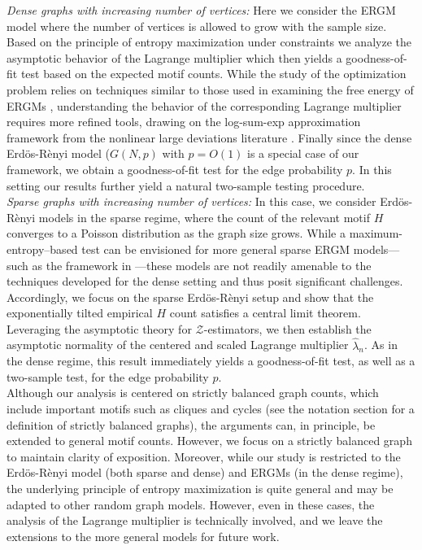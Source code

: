 \documentclass[12pt]{article}
\def\er{ Erd{\"o}s-R{\`e}nyi }
\numberwithin{equation}{section}
\begin{document}
\textit{Dense graphs with increasing number of vertices:} 
Here we consider the ERGM model where the number of vertices is allowed to grow with the sample size. Based on the principle of entropy maximization under constraints we analyze the asymptotic behavior of the Lagrange multiplier which then yields a goodness-of-fit test based on the expected motif counts. While the study of the optimization problem relies on techniques similar to those used in examining the free energy of ERGMs \cite{chatterjee2013estimating}, understanding the behavior of the corresponding Lagrange multiplier 
requires more refined tools, drawing on the log-sum-exp approximation framework from the nonlinear large deviations literature \cite{chatterjee2016nonlinear}. Finally since the dense \er model ($G(N,p)$ with $p=O(1)$ is a special case of our framework, we obtain a goodness-of-fit test for the edge probability $p$. In this setting our results further yield a natural two-sample testing procedure.\\



\textit{Sparse graphs with increasing number of vertices:} In this case, we consider \er models in the sparse regime, where the count of the relevant motif $H$ converges to a Poisson distribution as the graph size grows. While a maximum-entropy–based test can be envisioned for more general sparse ERGM models—such as the framework in \cite{cook2024typical}—these models are not readily amenable to the techniques developed for the dense setting and thus posit significant challenges.
Accordingly, we focus on the sparse \er setup and show that the exponentially tilted empirical $H$ count satisfies a central limit theorem. Leveraging the asymptotic theory for $\mathcal{Z}$-estimators,
 we then establish the asymptotic normality of the centered and scaled Lagrange multiplier 
$\hat{\lambda}_n$. As in the dense regime, this result immediately yields a goodness-of-fit test, as well as a two-sample test, for the edge probability 
$p$.\\


 Although our analysis is centered on strictly balanced graph counts, which include important motifs such as cliques and cycles (see the notation section for a definition of strictly balanced graphs), the arguments can, in principle, be extended to general motif counts. However, we focus on a strictly balanced graph to maintain clarity of exposition. Moreover, while our study is restricted to the \er model (both sparse and dense) and ERGMs (in the dense regime), the underlying principle of entropy maximization is quite general and may be adapted to other random graph models.
 However, even in these cases, the analysis of the Lagrange multiplier is technically involved, and we leave the extensions to the more general models for future work.
\end{document}

